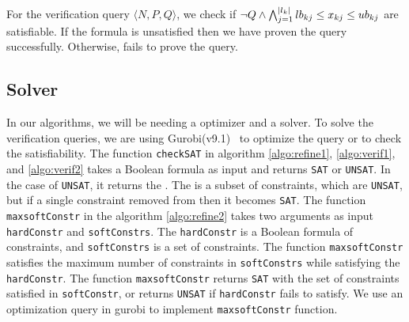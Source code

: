 For the verification query $\langle N, P, Q \rangle$, we check if
$\lnot Q \land \bigwedge_{j=1}^{|l_k|}lb_{kj} \leq x_{kj} \leq ub_{kj}$
are satisfiable.
%
If the formula is unsatisfied then we have proven the query successfully.
Otherwise, \deeppoly fails to prove the query.





\subsection{Solver}
\label{sec:solver}

In our algorithms, we will be needing a optimizer and a solver.
To solve the verification queries,
we are using Gurobi(v9.1)~\cite{gurobioptimizer} to optimize the query or to check the satisfiability. 
The function \texttt{checkSAT} in algorithm \ref{algo:refine1}, \ref{algo:verif1}, and
\ref{algo:verif2} 
takes a Boolean formula as input and returns \texttt{SAT} or \texttt{UNSAT}. 
In the case of \texttt{UNSAT}, it returns the \unsatcore{}. 
The \unsatcore{} is a subset of constraints, which are \texttt{UNSAT}, 
but if a single constraint removed from \unsatcore{} then it becomes \texttt{SAT}.
The function \texttt{maxsoftConstr} in the algorithm \ref{algo:refine2} takes
two arguments as input \texttt{hardConstr} and \texttt{softConstrs}. 
The \texttt{hardConstr} is a Boolean formula of constraints,
and \texttt{softConstrs} is a set of constraints. 
The function \texttt{maxsoftConstr} satisfies the maximum number of constraints
in \texttt{softConstrs} while satisfying the \texttt{hardConstr}. 
The function \texttt{maxsoftConstr} returns \texttt{SAT} with the set of
constraints satisfied in \texttt{softConstr}, or returns
\texttt{UNSAT} if \texttt{hardConstr} fails to satisfy.
We use an optimization query in gurobi to implement \texttt{maxsoftConstr} function.



